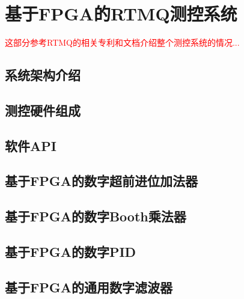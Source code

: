 
\chapter[基于FPGA的RTMQ测控系统]{基于FPGA的RTMQ测控系统}

\textcolor{red}{
这部分参考RTMQ的相关专利和文档介绍整个测控系统的情况... 
}
\section[系统架构介绍]{系统架构介绍}

\section[测控硬件组成]{测控硬件组成}

\section[软件API]{软件API}

\section[基于FPGA的数字超前进位加法器]{基于FPGA的数字超前进位加法器}

\section[基于FPGA的数字Booth乘法器]{基于FPGA的数字Booth乘法器}

\section[基于FPGA的数字PID]{基于FPGA的数字PID}

\section[基于FPGA的通用数字滤波器]{基于FPGA的通用数字滤波器}





